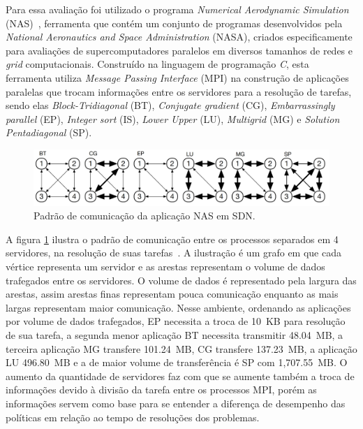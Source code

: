 Para essa avaliação foi utilizado o programa \emph{Numerical Aerodynamic Simulation} (NAS)~\cite{peterson1984numerical}, ferramenta que contém um conjunto de programas desenvolvidos pela \textit{National Aeronautics and Space Administration} (NASA), criados especificamente para avaliações de supercomputadores paralelos em diversos tamanhos de redes e \textit{grid} computacionais. Construído na linguagem de programação \textit{C}, esta ferramenta utiliza \emph{Message Passing Interface} (MPI) na construção de aplicações paralelas que trocam informações entre os servidores para a resolução de tarefas, sendo elas \emph{Block-Tridiagonal} (BT), \emph{Conjugate gradient} (CG), \emph{Embarrassingly parallel} (EP), \emph{Integer sort} (IS), \emph{Lower Upper} (LU), \emph{Multigrid} (MG) e \emph{Solution Pentadiagonal} (SP). 

\begin{figure}[!htb]
	\caption{\label{fig:padrao_nas}Padrão de comunicação da aplicação NAS em SDN.}
	\begin{center}
	    \includegraphics[scale=0.25]{imagens/padrao_comunicacao_nas.jpg}
	\end{center}
\end{figure}

A figura \ref{fig:padrao_nas} ilustra o padrão de comunicação entre os processos separados em 4 servidores, na resolução de suas tarefas~\cite{marcondes2016executing}. A ilustração é um grafo em que cada vértice representa um servidor e as arestas representam o volume de dados trafegados entre os servidores. O volume de dados é representado pela largura das arestas, assim arestas finas representam pouca comunicação enquanto as mais largas representam maior comunicação. Nesse ambiente, ordenando as aplicações por volume de dados trafegados, EP necessita a troca de 10~KB para resolução de sua tarefa, a segunda menor aplicação BT necessita transmitir 48.04~MB, a terceira aplicação MG transfere 101.24~MB, CG transfere 137.23~MB, a aplicação LU 496.80~MB e a de maior volume de transferência é SP com 1,707.55~MB. O aumento da quantidade de servidores faz com que se aumente também a troca de informações devido à divisão da tarefa entre os processos MPI, porém as informações servem como base para se entender a diferença de desempenho das políticas em relação ao tempo de resoluções dos problemas.

